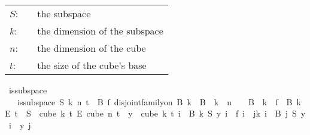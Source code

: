 \begin{isabellebody}
\begin{isamarkuptext}
\begin{tabular}{llp{8cm}}
$S$:& \isa{{\isacharparenleft}{\kern0pt}nat\ {\isasymRightarrow}\ nat{\isacharparenright}{\kern0pt}\ {\isasymRightarrow}\ nat\ {\isasymRightarrow}\ nat}& the subspace\\
$k$:& \isa{nat}& the dimension of the subspace\\
$n$:& \isa{nat}& the dimension of the cube\\
$t$:& \isa{nat}& the size of the cube's base
\end{tabular}%
\end{isamarkuptext}\isamarkuptrue%
\isamarkupfalse%
\ is{\isacharunderscore}{\kern0pt}subspace\isanewline
\ \ \ {\isachardoublequoteopen}is{\isacharunderscore}{\kern0pt}subspace\ S\ k\ n\ t\ {\isasymequiv}\ {\isacharparenleft}{\kern0pt}{\isasymexists}B\ f{\isachardot}{\kern0pt}\ disjoint{\isacharunderscore}{\kern0pt}family{\isacharunderscore}{\kern0pt}on\ B\ {\isacharbraceleft}{\kern0pt}{\isachardot}{\kern0pt}{\isachardot}{\kern0pt}k{\isacharbraceright}{\kern0pt}\ {\isasymand}\ {\isasymUnion}{\isacharparenleft}{\kern0pt}B\ {\isacharbackquote}{\kern0pt}\ {\isacharbraceleft}{\kern0pt}{\isachardot}{\kern0pt}{\isachardot}{\kern0pt}k{\isacharbraceright}{\kern0pt}{\isacharparenright}{\kern0pt}\ {\isacharequal}{\kern0pt}\ {\isacharbraceleft}{\kern0pt}{\isachardot}{\kern0pt}{\isachardot}{\kern0pt}{\isacharless}{\kern0pt}n{\isacharbraceright}{\kern0pt}\ {\isasymand}\ {\isacharparenleft}{\kern0pt}{\isacharbraceleft}{\kern0pt}{\isacharbraceright}{\kern0pt}\ {\isasymnotin}\ B\ {\isacharbackquote}{\kern0pt}\ {\isacharbraceleft}{\kern0pt}{\isachardot}{\kern0pt}{\isachardot}{\kern0pt}{\isacharless}{\kern0pt}k{\isacharbraceright}{\kern0pt}{\isacharparenright}{\kern0pt}\ {\isasymand}\ f\ {\isasymin}\ {\isacharparenleft}{\kern0pt}B\ k{\isacharparenright}{\kern0pt}\ {\isasymrightarrow}\isactrlsub E\ {\isacharbraceleft}{\kern0pt}{\isachardot}{\kern0pt}{\isachardot}{\kern0pt}{\isacharless}{\kern0pt}t{\isacharbraceright}{\kern0pt}\ {\isasymand}\ S\ {\isasymin}\ {\isacharparenleft}{\kern0pt}cube\ k\ t{\isacharparenright}{\kern0pt}\ {\isasymrightarrow}\isactrlsub E\ {\isacharparenleft}{\kern0pt}cube\ n\ t{\isacharparenright}{\kern0pt}\ {\isasymand}\ {\isacharparenleft}{\kern0pt}{\isasymforall}y\ {\isasymin}\ cube\ k\ t{\isachardot}{\kern0pt}\ {\isacharparenleft}{\kern0pt}{\isasymforall}i\ {\isasymin}\ B\ k{\isachardot}{\kern0pt}\ S\ y\ i\ {\isacharequal}{\kern0pt}\ f\ i{\isacharparenright}{\kern0pt}\ {\isasymand}\ {\isacharparenleft}{\kern0pt}{\isasymforall}j{\isacharless}{\kern0pt}k{\isachardot}{\kern0pt}\ {\isasymforall}i\ {\isasymin}\ B\ j{\isachardot}{\kern0pt}\ {\isacharparenleft}{\kern0pt}S\ y{\isacharparenright}{\kern0pt}\ i\ {\isacharequal}{\kern0pt}\ y\ j{\isacharparenright}{\kern0pt}{\isacharparenright}{\kern0pt}{\isacharparenright}{\kern0pt}{\isachardoublequoteclose}%

\end{isabellebody}
